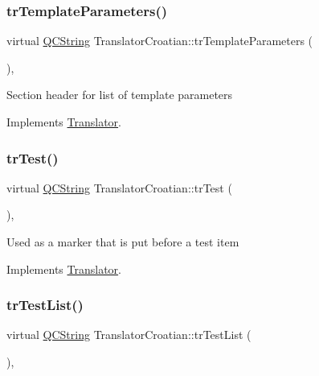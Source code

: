 \subsubsection{\texorpdfstring{trTemplateParameters()}{trTemplateParameters()}}
{\footnotesize\ttfamily virtual \mbox{\hyperlink{class_q_c_string}{Q\+C\+String}} Translator\+Croatian\+::tr\+Template\+Parameters (\begin{DoxyParamCaption}{ }\end{DoxyParamCaption})\hspace{0.3cm}{\ttfamily [inline]}, {\ttfamily [virtual]}}

Section header for list of template parameters 

Implements \mbox{\hyperlink{class_translator}{Translator}}.

\mbox{\label{class_translator_croatian_abde32277d4a372a6b4de6aea3b84ce76}} 
\subsubsection{\texorpdfstring{trTest()}{trTest()}}
{\footnotesize\ttfamily virtual \mbox{\hyperlink{class_q_c_string}{Q\+C\+String}} Translator\+Croatian\+::tr\+Test (\begin{DoxyParamCaption}{ }\end{DoxyParamCaption})\hspace{0.3cm}{\ttfamily [inline]}, {\ttfamily [virtual]}}

Used as a marker that is put before a test item 

Implements \mbox{\hyperlink{class_translator}{Translator}}.

\mbox{\label{class_translator_croatian_aca1bdb7de19fc5f7ded7b96309f0e86a}} 
\subsubsection{\texorpdfstring{trTestList()}{trTestList()}}
{\footnotesize\ttfamily virtual \mbox{\hyperlink{class_q_c_string}{Q\+C\+String}} Translator\+Croatian\+::tr\+Test\+List (\begin{DoxyParamCaption}{ }\end{DoxyParamCaption})\hspace{0.3cm}{\ttfamily [inline]}, {\ttfamily [virtual]}}

